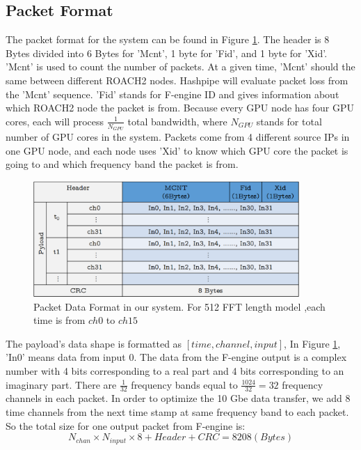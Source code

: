 \documentclass{ws-jai}
\begin{document}
\subsection{Packet Format \label{sec:Data formate}}
The packet format for the system can be found in Figure \ref{fig:data_formate}. The header is 8 Bytes divided into 6 Bytes for 'Mcnt', 1 byte for 'Fid', and 1 byte for 'Xid'. 'Mcnt' is used to count the number of packets. At a given time, 'Mcnt' should the same between different ROACH2 nodes. Hashpipe will evaluate packet loss from the 'Mcnt' sequence. 'Fid' stands for F-engine ID and gives information about which ROACH2 node the packet is from. Because every GPU node has four GPU cores, each will process $\frac{1}{N_{GPU}}$ total bandwidth, where $N_{GPU}$ stands for total number of GPU cores in the system. Packets come from 4 different source IPs in one GPU node, and each node uses 'Xid' to know which GPU core the packet is going to and which frequency band the packet is from. 
\begin{figure}[t]
\centering
\includegraphics[width=0.9\textwidth]{./picture/Packet.eps}
\caption{Packet Data Format in our system. For 512 FFT length model ,each time is from $ch0$ to $ch15$\label{fig:data_formate}}
\end{figure}

	The payload's data shape is formatted as $[time, channel, input]$, In Figure \ref{fig:data_formate}, 'In0' means data from input 0. The data from the F-engine output is a complex number with 4 bits corresponding to a real part and 4 bits corresponding to an imaginary part. There are $\frac{1}{32}$ frequency bands equal to $\frac{1024}{32}=32$ frequency channels in each packet. In order to optimize the 10 Gbe data transfer, we add 8 time channels from the next time stamp at same frequency band to each packet. So the total size for one output packet from F-engine is:
\begin{equation} 
N_{chan}  \times N_{input} \times 8 + Header + CRC = 8208  (Bytes)
\end{equation}
\end{document}
